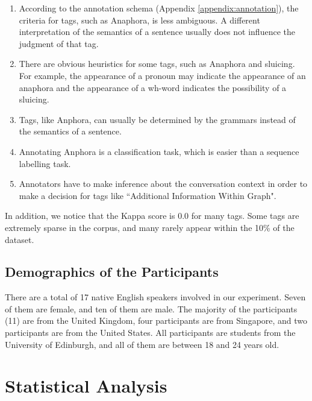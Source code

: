 \documentclass[bsc,frontabs,twoside,singlespacing,parskip,deptreport]{infthesis}     %
\begin{document}
\begin{enumerate}

    \item According to the annotation schema (Appendix \ref{appendix:annotation}), the criteria for tags, such as Anaphora, is less ambiguous. A different interpretation of the semantics of a sentence usually does not influence the judgment of that tag.
    
   \item There are obvious heuristics for some tags, such as Anaphora and sluicing. For example, the appearance of a pronoun may indicate the appearance of an anaphora and the appearance of a wh-word indicates the possibility of a sluicing. 

   \item Tags, like Anphora, can usually be determined by the grammars instead of the semantics of a sentence.
   
   \item Annotating Anphora is a classification task, which is easier than a sequence labelling task.
   
   \item Annotators have to make inference about the conversation context in order to make a decision for tags like ``Additional Information Within Graph".
   
\end{enumerate}

In addition, we notice that the Kappa score is 0.0 for many tags. Some tags are extremely sparse in the corpus, and many rarely appear within the 10\% of the dataset.

\subsection*{Demographics of the Participants}

There are a total of 17 native English speakers involved in our experiment. Seven of them are female, and ten of them are male. The majority of the participants (11) are from the United Kingdom, four participants are from Singapore, and two participants are from the United States. All participants are students from the University of Edinburgh, and all of them are between 18 and 24 years old.

\section{Statistical Analysis}
\end{document}
